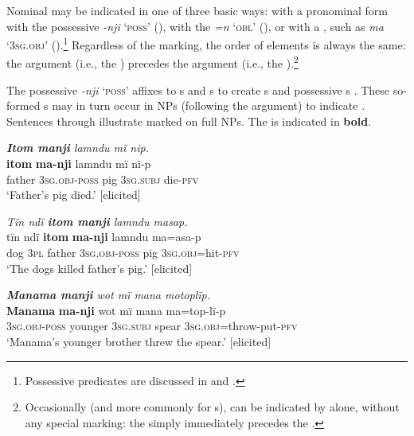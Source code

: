 Nominal  may be indicated in one of three basic ways: with a pronominal form with the possessive  \textit{{}-nji} \textsc{`poss’} (), with the   \textit{=n} \textsc{`obl’} (), or with a , such as \textit{ma} \textsc{`3sg.obj’} ().\footnote{Possessive predicates  are discussed in  and .} Regardless of the marking, the order of elements is always the same: the  argument (i.e., the ) precedes the  argument (i.e., the ).\footnote{Occasionally (and more commonly for  s),  can be indicated by  alone, without any special marking: the  simply immediately precedes the .}

The possessive  \textit{{}-nji} \textsc{`poss’} affixes to s and s to create s and possessive s . These so-formed s may in turn occur in NPs (following the  argument) to indicate . Sentences  through  illustrate  marked on full NPs. The  is indicated in \textbf{bold}.

\ea%
    \label{ex:phrase:9}
          \textit{\textbf{Itom manji} lamndu mï nip.}\\
\gll    \textbf{itom}  \textbf{ma-nji}      lamndu  mï      ni-p\\
    father  \textsc{3sg.obj-poss}  pig      3\textsc{sg.subj}  die-\textsc{pfv}\\
\glt `Father’s pig died.’ [elicited]
\z

\ea%
    \label{ex:phrase:10}
          \textit{Tïn ndï \textbf{itom manji} lamndu masap.}\\
\gll    tïn    ndï  \textbf{itom}  \textbf{ma-nji}      lamndu  ma=asa-p\\
    dog  3\textsc{pl}  father  \textsc{3sg.obj-poss}  pig      3\textsc{sg.obj}=hit-\textsc{pfv}\\
\glt `The dogs killed father’s pig.’ [elicited]
\z

\ea%
    \label{ex:phrase:11}
          \textit{\textbf{Manama manji} wot mï mana motoplïp.}\\
\gll    \textbf{Manama}  \textbf{ma-nji}      wot    mï      mana ma=top-lï-p\\
    [name]    3\textsc{sg.obj-poss}  younger  3\textsc{sg.subj}  spear    3\textsc{sg.obj}=throw-put-\textsc{pfv}\\
\glt `Manama’s younger brother threw the spear.’ [elicited]
\z

